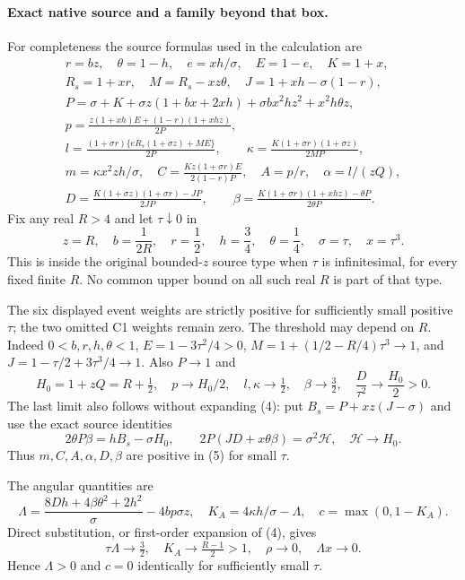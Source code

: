 \documentclass[11pt]{article}
\begin{document}
\paragraph{Exact native source and a family beyond that box.}
For completeness the source formulas used in the calculation are
\[
\begin{gathered}
 r=bz,\quad \theta=1-h,\quad e=xh/\sigma,\quad E=1-e,\quad K=1+x,\\
 R_s=1+xr,\quad M=R_s-xz\theta,\quad
 J=1+xh-\sigma(1-r),\\
 P=\sigma+K+\sigma z(1+bx+2xh)
       +\sigma bx^2hz^2+x^2h\theta z,\\
 p=\frac{z(1+xh)E+(1-r)(1+xhz)}{2P},\\
 l=\frac{(1+\sigma r)\{eR_s(1+\sigma z)+ME\}}{2P},\qquad
 \kappa=\frac{K(1+\sigma r)(1+\sigma z)}{2MP},\\
 m=\kappa x^2zh/\sigma,\quad
 C=\frac{Kz(1+\sigma r)E}{2(1-r)P},\quad
 A=p/r,\quad \alpha=l/(zQ),\\
 D=\frac{K(1+\sigma z)(1+\sigma r)-JP}{2JP},\qquad
 \beta=\frac{K(1+\sigma r)(1+xhz)-\theta P}{2\theta P}.
\end{gathered} \tag{4}
\]
Fix any real $R>4$ and let $\tau\downarrow0$ in
\[
 z=R,\quad b=\frac1{2R},\quad r=\frac12,\quad
 h=\frac34,\quad \theta=\frac14,\quad
 \sigma=\tau,\quad x=\tau^3.
 \tag{5}
\]
This is inside the original bounded-$z$ source type when $\tau$ is
infinitesimal, for every fixed finite $R$. No common upper bound on
all such real $R$ is part of that type.

The six displayed event weights are strictly positive for sufficiently
small positive $\tau$; the two omitted C1 weights remain zero.
The threshold may depend on $R$.
Indeed $0<b,r,h,\theta<1$, $E=1-3\tau^2/4>0$,
$M=1+(1/2-R/4)\tau^3\to1$, and
$J=1-\tau/2+3\tau^3/4\to1$. Also $P\to1$ and
\[
 H_0=1+zQ=R+\tfrac12,\quad
 p\longrightarrow H_0/2,\quad l,\kappa\longrightarrow\tfrac12,
 \quad \beta\longrightarrow\tfrac32,\quad
 \frac D{\tau^2}\longrightarrow\frac{H_0}{2}>0.
 \tag{6}
\]
The last limit also follows without expanding (4): put
$B_s=P+xz(J-\sigma)$ and use the exact source identities
\[
 2\theta P\beta=hB_s-\sigma H_0,\qquad
 2P(JD+x\theta\beta)=\sigma^2\mathcal H,
 \quad \mathcal H\longrightarrow H_0.
\]
Thus $m,C,A,\alpha,D,\beta$ are positive in (5) for small $\tau$.

The angular quantities are
\[
 \Lambda=\frac{8Dh+4\beta\theta^2+2h^2}{\sigma}
                  -4bp\sigma z,\quad
 K_A=4\kappa h/\sigma-\Lambda,\quad c=\max(0,1-K_A).
\]
Direct substitution, or first-order expansion of (4), gives
\[
 \tau\Lambda\longrightarrow\tfrac32,\quad
 K_A\longrightarrow\tfrac{R-1}{2}>1,\quad
 \rho\longrightarrow0,\quad \Lambda x\longrightarrow0.
 \tag{7}
\]
Hence $\Lambda>0$ and $c=0$ identically for sufficiently small $\tau$.
\end{document}
